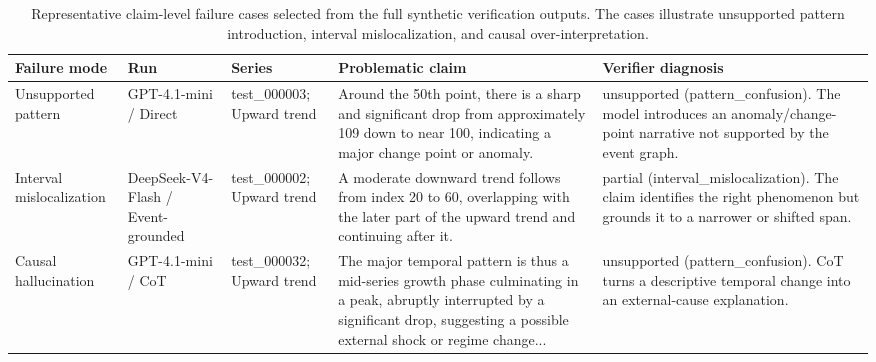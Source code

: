 \begin{table}[t]
\centering
\footnotesize
\setlength{\tabcolsep}{3pt}
\begin{tabular}{@{}p{}p{}p{}p{}p{}@{}}
\toprule
Failure mode & Run & Series & Problematic claim & Verifier diagnosis \\
\midrule
Unsupported pattern & GPT-4.1-mini / Direct & test\_000003; Upward trend & Around the 50th point, there is a sharp and significant drop from approximately 109 down to near 100, indicating a major change point or anomaly. & unsupported (pattern\_confusion). The model introduces an anomaly/change-point narrative not supported by the event graph. \\
Interval mislocalization & DeepSeek-V4-Flash / Event-grounded & test\_000002; Upward trend & A moderate downward trend follows from index 20 to 60, overlapping with the later part of the upward trend and continuing after it. & partial (interval\_mislocalization). The claim identifies the right phenomenon but grounds it to a narrower or shifted span. \\
Causal hallucination & GPT-4.1-mini / CoT & test\_000032; Upward trend & The major temporal pattern is thus a mid-series growth phase culminating in a peak, abruptly interrupted by a significant drop, suggesting a possible external shock or regime change... & unsupported (pattern\_confusion). CoT turns a descriptive temporal change into an external-cause explanation. \\
\bottomrule
\end{tabular}
\caption{Representative claim-level failure cases selected from the full synthetic verification outputs. The cases illustrate unsupported pattern introduction, interval mislocalization, and causal over-interpretation.}
\label{tab:error-cases}
\end{table}
